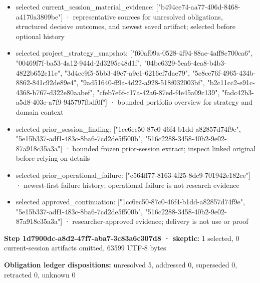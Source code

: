 \documentclass[11pt]{article}
\begin{document}
\begin{itemize}
\item selected current\_session\_material\_evidence: ["b494ce74-aa77-406d-8468-a4170a3809be"] · representative sources for unresolved obligations, structured decisive outcomes, and newest saved artifact; selected before optional history
\item selected project\_strategy\_snapshot: ["f60af09a-0528-4f94-88ae-4aff8c700ca6", "00469f7f-ba53-4a12-944d-2d3295e48d1f", "04bc6329-5ea6-4ea8-b4b3-4822b652c11e", "3d4cc9f5-5bb3-49c7-a9c1-6216ef7dae79", "5c8ce76f-4965-434b-8862-841c92de89e4", "9ad51640-ff9a-4d22-a928-518f032003bf", "b2c11cc2-e91c-4368-b767-d322e80aabef", "cfeb7e6f-c17a-42a6-87ed-f4e45a09c139", "fadc42b3-a5d8-403c-a7f9-945797fbdf0f"] · bounded portfolio overview for strategy and domain context
\item selected prior\_session\_finding: ["1cc6ec50-87c0-46f4-b1dd-a82857d74f9e", "5e15b337-adf1-483c-8ba6-7cd2de5f500b", "516c2288-3458-40b2-9e02-87a918c35a3a"] · bounded frozen prior-session extract; inspect linked original before relying on details
\item selected prior\_operational\_failure: ["c564ff77-8163-4f25-8dc9-701942e182ce"] · newest-first failure history; operational failure is not research evidence
\item selected approved\_continuation: ["1cc6ec50-87c0-46f4-b1dd-a82857d74f9e", "5e15b337-adf1-483c-8ba6-7cd2de5f500b", "516c2288-3458-40b2-9e02-87a918c35a3a"] · researcher-approved evidence; delivery is not use or proof
\end{itemize}
\textbf{Step 1d7900dc-a8d2-47f7-aba7-3c83a6c307d8 · skeptic:} 1 selected, 0 current-session artifacts omitted, 63599 UTF-8 bytes\par
\textbf{Obligation ledger dispositions:} unresolved 5, addressed 0, superseded 0, retracted 0, unknown 0\par
\end{document}
